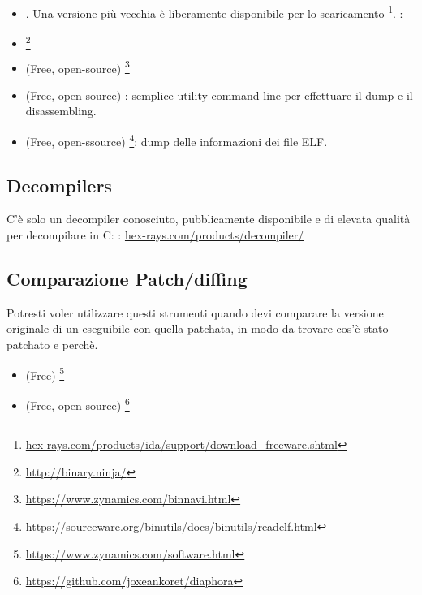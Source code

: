 
\begin{itemize}
\item {}. Una versione più vecchia è liberamente disponibile per lo scaricamento
\footnote{\href{http://go.yurichev.com/17031}{hex-rays.com/products/ida/support/download\_freeware.shtml}}.
\ShortHotKeyCheatsheet: 

\item {}\footnote{\url{http://binary.ninja/}}

\item (Free, open-source) \footnote{\url{https://www.zynamics.com/binnavi.html}}

\item (Free, open-source) : semplice utility command-line per effettuare il dump e il disassembling.

\item (Free, open-ssource) \footnote{\url{https://sourceware.org/binutils/docs/binutils/readelf.html}}:
dump delle informazioni dei file ELF.
\end{itemize}

\subsection{Decompilers}

C'è solo un decompiler conosciuto, pubblicamente disponibile e di elevata qualità per decompilare in C: :
\href{http://go.yurichev.com/17033}{hex-rays.com/products/decompiler/}


\subsection{Comparazione Patch/diffing}

Potresti voler utilizzare questi strumenti quando devi comparare la versione originale di un eseguibile con quella patchata,
in modo da trovare cos'è stato patchato e perchè.

\begin{itemize}
\item (Free) \footnote{\url{https://www.zynamics.com/software.html}}

\item (Free, open-source) \footnote{\url{https://github.com/joxeankoret/diaphora}}
\end{itemize}


